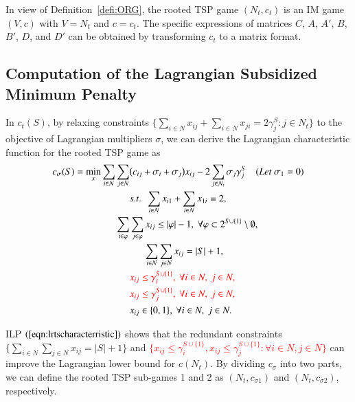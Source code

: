 \documentclass[authoryear,review,12pt]{elsarticle}
\begin{document}
In view of Definition~\ref{defi:ORG}, the rooted TSP game $ (N_t,c_{t})$ is an IM game $(V,c)$ with $V=N_t$ and $c = c_{t}$. The specific expressions of matrices $C$, $A$, $A'$, $B$, $B'$, $D$, and $D'$ can be obtained by transforming $c_{t}$ to a matrix format.



\subsection{Computation of the Lagrangian Subsidized Minimum Penalty}\label{section:LRBTSP}
In $c_{t}(S)$, by relaxing constraints $\big\{ \sum_{i \in N}x_{ij} + \sum_{i \in N}x_{ji} = 2\gamma_j^S: j \in N_t \big\}$ to the objective of Lagrangian multipliers $\sigma$, we can derive the Lagrangian characteristic function for the rooted TSP game as
\begin{eqnarray}\label{eqn:lrtscharacterristic}
\begin{aligned}
c_{\sigma}(S) = \min_{x} \sum_{i \in N} \sum_{j \in N} &\big(c_{ij} + \sigma_i + \sigma_j \big)x_{ij} - 2\sum_{j \in N_t} \sigma_j\gamma_j^S ~~~~(Let~\sigma_1 = 0) \\
&s.t.~~\sum_{i \in N}x_{i1} + \sum_{i \in N}x_{1i} = 2,\\
\sum_{i \in \varphi} &\sum_{j \in \varphi} x_{ij} \leq |\varphi| - 1, ~\forall \varphi \subset 2^{S \cup \{1\}} \setminus \emptyset,\\
&~~~~~~\sum_{i \in N} \sum_{j \in N} x_{ij} = |S|+1,\\
&\textcolor{red}{x_{ij} \leq \gamma_i^{S\cup\{1\}},~\forall i \in N,~ j \in N,}\\
&\textcolor{red}{x_{ij} \leq \gamma_j^{S\cup\{1\}},~\forall i \in N,~ j \in N,}\\
&x_{ij} \in \{0,1\}, ~\forall i \in N, ~j \in N.
\end{aligned}
\end{eqnarray}

ILP $(\ref{eqn:lrtscharacterristic})$ shows that the redundant constraints $\big\{ \sum_{i \in N} \sum_{j \in N} x_{ij} = |S|+1 \big\}$ and \textcolor{red}{$\big\{
x_{ij} \leq \gamma_i^{S\cup\{1\}}, x_{ij} \leq \gamma_j^{S\cup\{1\}} :\forall i \in N, j \in N \big\}$} can improve the Lagrangian lower bound for $c(N_t)$.
By dividing $c_{\sigma}$ into two parts, we can define the rooted TSP sub-games 1 and 2 as $(N_t,c_{\sigma1})$ and $(N_t,c_{\sigma2})$, respectively.
\end{document}
